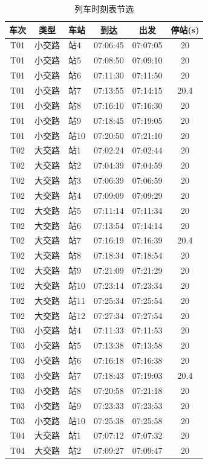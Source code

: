 \begin{table}[H]
\centering
\caption{列车时刻表节选}
\label{tab:rail-timetable-sample}
\small
\begin{tabular}{cclccc}
\toprule
车次 & 类型 & 车站 & 到达 & 出发 & 停站(s) \\
\midrule
T01 & 小交路 & 站4 & 07:06:45 & 07:07:05 & 20 \\
T01 & 小交路 & 站5 & 07:08:50 & 07:09:10 & 20 \\
T01 & 小交路 & 站6 & 07:11:30 & 07:11:50 & 20 \\
T01 & 小交路 & 站7 & 07:13:55 & 07:14:15 & 20.4 \\
T01 & 小交路 & 站8 & 07:16:10 & 07:16:30 & 20 \\
T01 & 小交路 & 站9 & 07:18:45 & 07:19:05 & 20 \\
T01 & 小交路 & 站10 & 07:20:50 & 07:21:10 & 20 \\
T02 & 大交路 & 站1 & 07:02:24 & 07:02:44 & 20 \\
T02 & 大交路 & 站2 & 07:04:39 & 07:04:59 & 20 \\
T02 & 大交路 & 站3 & 07:06:39 & 07:06:59 & 20 \\
T02 & 大交路 & 站4 & 07:09:09 & 07:09:29 & 20 \\
T02 & 大交路 & 站5 & 07:11:14 & 07:11:34 & 20 \\
T02 & 大交路 & 站6 & 07:13:54 & 07:14:14 & 20 \\
T02 & 大交路 & 站7 & 07:16:19 & 07:16:39 & 20.4 \\
T02 & 大交路 & 站8 & 07:18:34 & 07:18:54 & 20 \\
T02 & 大交路 & 站9 & 07:21:09 & 07:21:29 & 20 \\
T02 & 大交路 & 站10 & 07:23:14 & 07:23:34 & 20 \\
T02 & 大交路 & 站11 & 07:25:34 & 07:25:54 & 20 \\
T02 & 大交路 & 站12 & 07:27:34 & 07:27:54 & 20 \\
T03 & 小交路 & 站4 & 07:11:33 & 07:11:53 & 20 \\
T03 & 小交路 & 站5 & 07:13:38 & 07:13:58 & 20 \\
T03 & 小交路 & 站6 & 07:16:18 & 07:16:38 & 20 \\
T03 & 小交路 & 站7 & 07:18:43 & 07:19:03 & 20.4 \\
T03 & 小交路 & 站8 & 07:20:58 & 07:21:18 & 20 \\
T03 & 小交路 & 站9 & 07:23:33 & 07:23:53 & 20 \\
T03 & 小交路 & 站10 & 07:25:38 & 07:25:58 & 20 \\
T04 & 大交路 & 站1 & 07:07:12 & 07:07:32 & 20 \\
T04 & 大交路 & 站2 & 07:09:27 & 07:09:47 & 20 \\
\bottomrule
\end{tabular}
\end{table}
